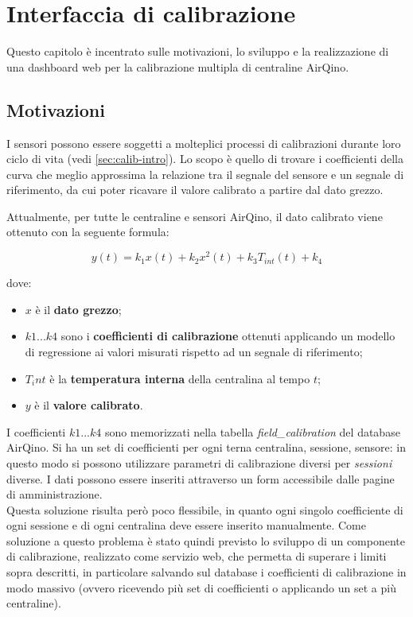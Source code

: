 \chapter{Interfaccia di calibrazione}\label{ch:interfaccia}
Questo capitolo è incentrato sulle motivazioni, lo sviluppo e la realizzazione di una dashboard web per la calibrazione multipla di centraline AirQino.

\section{Motivazioni}\label{sec:motivazioni}
I sensori possono essere soggetti a molteplici processi di calibrazioni durante loro ciclo di vita (vedi \ref{sec:calib-intro}). Lo scopo è quello di trovare i coefficienti della curva che meglio approssima la relazione tra il segnale del sensore e un segnale di riferimento, da cui poter ricavare il valore calibrato a partire dal dato grezzo.

Attualmente, per tutte le centraline e sensori AirQino, il dato calibrato viene ottenuto con la seguente formula:

$$y(t)=k_{1} x(t)+k_{2} x^{2}(t)+k_{3} T_{int}(t)+k_{4}$$\smallskip

\clearpage

dove:

\begin{itemize}
  \item $x$ è il \textbf{dato grezzo};
  \item $k1...k4$ sono i \textbf{coefficienti di calibrazione} ottenuti applicando un modello di regressione ai valori misurati rispetto ad un segnale di riferimento;
  \item $T_int$ è la \textbf{temperatura interna} della centralina al tempo $t$;
  \item $y$ è il \textbf{valore calibrato}.
\end{itemize}

I coefficienti $k1...k4$ sono memorizzati nella tabella \textit{field\_calibration} del database AirQino. Si ha
un set di coefficienti per ogni terna centralina, sessione, sensore: in questo modo si possono utilizzare parametri di calibrazione diversi per \textit{sessioni} diverse. I dati possono essere inseriti attraverso un form accessibile dalle pagine di amministrazione.\\

Questa soluzione risulta però poco flessibile, in quanto ogni singolo coefficiente di ogni sessione e di ogni centralina deve essere inserito manualmente. Come soluzione a questo problema è stato quindi previsto lo sviluppo di un componente di calibrazione, realizzato come servizio web, che permetta di superare i limiti sopra descritti, in particolare salvando sul database i coefficienti di calibrazione in modo massivo (ovvero ricevendo più set di coefficienti o applicando un set a più centraline).

